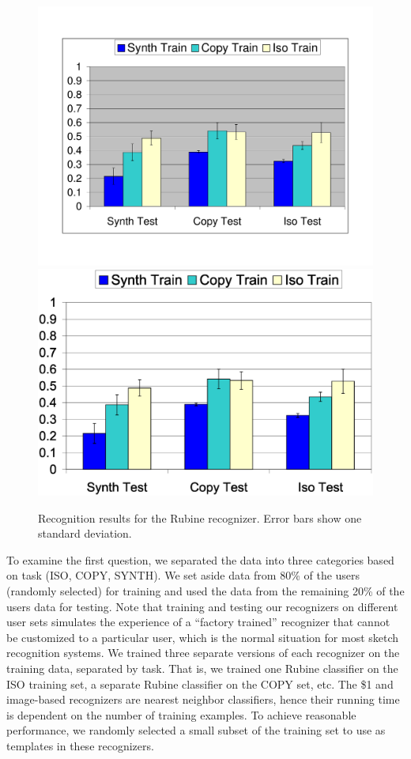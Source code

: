 \documentclass{egpubl}
\begin{document}
\begin{figure}
\ifpdf \includegraphics[width=1.0\hsize]{rubine_summary}
\else \includegraphics[width=1.0\hsize]{rubine_summary.eps} \fi
\caption{Recognition results for the Rubine recognizer. Error bars show one standard deviation.}
\label{rubineGraph}
\end{figure}

To examine the first question, we separated the data into three categories based on task (ISO, COPY, SYNTH).  We set aside 
data from 80\% of the users (randomly selected) for training and used the data from the remaining 20\% of the users data for testing.  Note that training and testing our recognizers on different user sets simulates the experience of a ``factory trained'' recognizer that cannot be customized to a particular user, which is the normal situation for most sketch recognition systems.  We trained three separate versions of each recognizer on the training data, separated by task.  That is, we trained one Rubine classifier on the ISO training set, a separate Rubine classifier on the COPY set, etc.  The \$1 and image-based recognizers are nearest neighbor classifiers, hence their running time is dependent on the number of training examples.  To achieve reasonable performance, we randomly selected a small subset of the training set to use as templates in these recognizers.  
\end{document}
